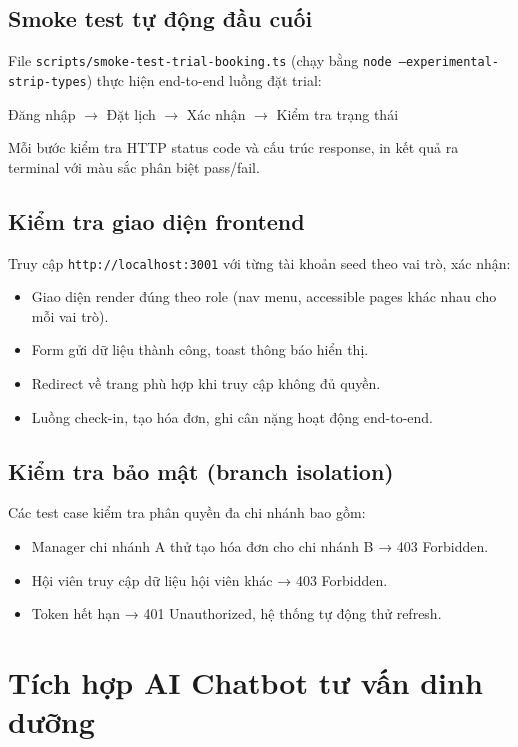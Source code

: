 \subsection{Smoke test tự động đầu cuối}
File \texttt{scripts/smoke-test-trial-booking.ts} (chạy bằng \texttt{node --experimental-strip-types}) thực hiện end-to-end luồng đặt trial:
\begin{center}
    Đăng nhập $\rightarrow$ Đặt lịch $\rightarrow$ Xác nhận $\rightarrow$ Kiểm tra trạng thái
\end{center}
Mỗi bước kiểm tra HTTP status code và cấu trúc response, in kết quả ra terminal với màu sắc phân biệt pass/fail.

\subsection{Kiểm tra giao diện frontend}
Truy cập \texttt{http://localhost:3001} với từng tài khoản seed theo vai trò, xác nhận:
\begin{itemize}
    \item Giao diện render đúng theo role (nav menu, accessible pages khác nhau cho mỗi vai trò).
    \item Form gửi dữ liệu thành công, toast thông báo hiển thị.
    \item Redirect về trang phù hợp khi truy cập không đủ quyền.
    \item Luồng check-in, tạo hóa đơn, ghi cân nặng hoạt động end-to-end.
\end{itemize}

\subsection{Kiểm tra bảo mật (branch isolation)}
Các test case kiểm tra phân quyền đa chi nhánh bao gồm:
\begin{itemize}
    \item Manager chi nhánh A thử tạo hóa đơn cho chi nhánh B → 403 Forbidden.
    \item Hội viên truy cập dữ liệu hội viên khác → 403 Forbidden.
    \item Token hết hạn → 401 Unauthorized, hệ thống tự động thử refresh.
\end{itemize}

\section{Tích hợp AI Chatbot tư vấn dinh dưỡng}
